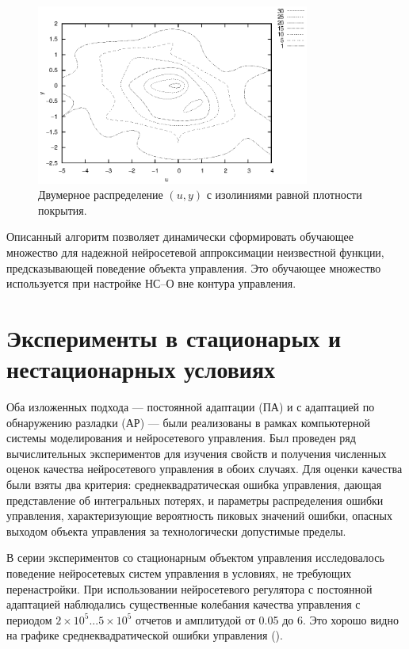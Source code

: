 \begin{figure}[h]
\centering
\includegraphics[width=0.8\textwidth,%
  totalheight=0.4\textheight]{u_ny_d2d_ru}
\caption{Двумерное распределение $(u,y)$ с изолиниями равной плотности
  покрытия.}
\label{fig:u_ny_d2d_ru}
\end{figure}

Описанный алгоритм позволяет динамически сформировать обучающее
множество для надежной нейросетевой аппроксимации неизвестной функции,
предсказывающей поведение объекта управления.  Это обучающее множество
используется при настройке НС--О вне контура управления.

\section{Эксперименты в стационарых и нестационарных условиях}

Оба изложенных подхода --- постоянной адаптации (ПА) и с адаптацией по
обнаружению разладки (АР) --- были реализованы в рамках компьютерной
системы моделирования и нейросетевого управления.  Был проведен ряд
вычислительных экспериментов для изучения свойств и получения
численных оценок качества нейросетевого управления в обоих случаях.
Для оценки качества были взяты два критерия: среднеквадратическая
ошибка управления, дающая представление об интегральных потерях, и
параметры распределения ошибки управления, характеризующие вероятность
пиковых значений ошибки, опасных выходом объекта управления за
технологически допустимые пределы.


В серии экспериментов со стационарным объектом управления
исследовалось поведение нейросетевых систем управления в условиях, не
требующих перенастройки.  При использовании нейросетевого регулятора с
постоянной адаптацией наблюдались существенные колебания качества
управления с периодом $2\times 10^5...5\times 10^5$ отчетов и
амплитудой от 0.05 до 6. Это хорошо видно на графике
среднеквадратической ошибки управления
().

